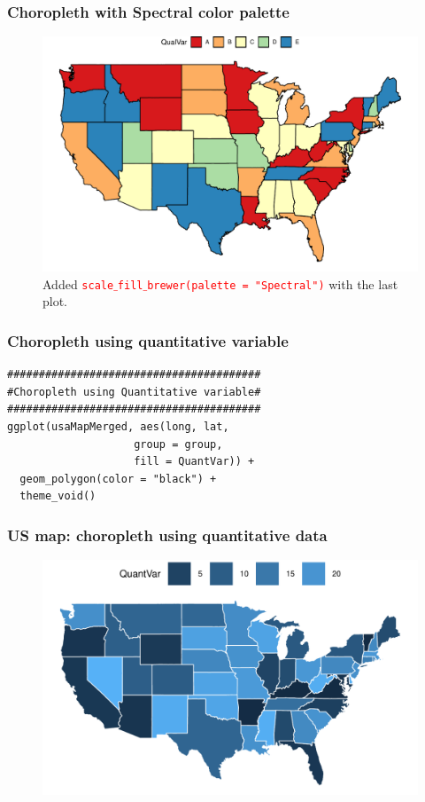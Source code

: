 \documentclass{beamer}
\begin{document}
\begin{frame}\frametitle{Choropleth with Spectral color palette}
\begin{figure}
\includegraphics[width=0.99\linewidth]{PlotsLec4/UsaChoroplethQual2}
\caption{{\small Added \texttt{\textcolor{red}{scale$\_$fill$\_$brewer(palette = "Spectral")}} with the last plot.}}
\end{figure}
\end{frame}

\begin{frame}[fragile]\frametitle{Choropleth using quantitative variable}
\begin{lstlisting}
########################################
#Choropleth using Quantitative variable#
########################################                          
ggplot(usaMapMerged, aes(long, lat,
                    group = group,
                    fill = QuantVar)) +
  geom_polygon(color = "black") +
  theme_void()
\end{lstlisting}
\end{frame}

\begin{frame}\frametitle{US map: choropleth using quantitative data}
\begin{figure}
\includegraphics[width=0.99\linewidth]{PlotsLec4/UsaChoroplethQuant}
\end{figure}
\end{frame}
\end{document}
